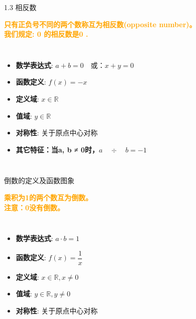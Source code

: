 \documentclass[aspectratio=169]{ctexbeamer} %
\date{\today}
\begin{document}
\begin{frame}{1.3 相反数}
\begin{definition}
\textbf{\textcolor{orange}{只有正负号不同的两个数称互为相反数(opposite number)。\\
我们规定: 0 的相反数是0 .}}
\end{definition}
\begin{columns}
\begin{itemize}
    \item \textbf{数学表达式}:  $a + b = 0 \quad \text{或：}  x + y = 0$
    \item \textbf{函数定义}:  $f(x) = -x$
    \item \textbf{定义域}: $x \in \mathbb{R}$
    \item \textbf{值域}: $y \in \mathbb{R}$
    \item \textbf{对称性}: 关于原点中心对称
    \item \textbf{其它特征：当a, b ≠ 0时，}$ a \quad ÷ \quad b = -1$
\end{itemize}


\begin{figure}
\centering
\scalebox{1.8}{}
\end{figure}

\end{columns}
\end{frame}

\begin{frame}{倒数的定义及函数图象}
\begin{definition}
\textbf{\textcolor{orange}{乘积为1的两个数互为倒数。\\
注意：0没有倒数。}}
\end{definition}
\begin{columns}
\begin{itemize}
    \item \textbf{数学表达式}:  $a \cdot b = 1 $
    \item \textbf{函数定义}:  $f(x) = \dfrac{1}{x}$
    \item \textbf{定义域}: $x \in \mathbb{R}, x \neq 0$
    \item \textbf{值域}: $y \in \mathbb{R}, y \neq 0$
    \item \textbf{对称性}: 关于原点中心对称
\end{itemize}

\begin{figure}
\centering
\scalebox{1.8}{}
\end{figure}
\end{columns}
\end{frame}
\end{document}
